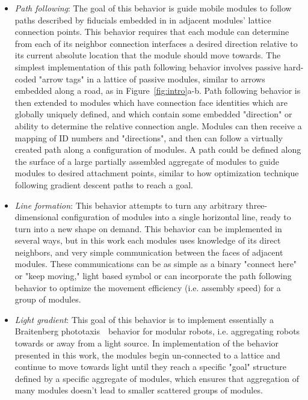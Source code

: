 \begin{itemize}
	\item \textit{Path following}: The goal of this behavior is guide mobile modules to follow paths described by fiducials embedded in in adjacent modules' lattice connection points. This behavior requires that  each module can determine from each of its neighbor connection interfaces a desired direction relative to its current absolute location that the module should move towards. The simplest implementation of this path following behavior involves passive hard-coded "arrow tags" in a lattice of passive modules, similar to arrows embedded along a road, as in Figure~\ref{fig:intro}a-b. Path following behavior is then extended to modules which have connection face identities which are globally uniquely defined, and which contain some embedded "direction" or ability to determine the relative connection angle. Modules can then receive a mapping of ID numbers and "directions", and then can follow a virtually created path along a configuration of modules. A path could be defined along the surface of a large partially assembled aggregate of modules to guide modules to desired attachment points, similar to how optimization technique following gradient descent paths to reach a goal.
	
	\item \textit{Line formation}: This behavior attempts to turn any arbitrary three-dimensional configuration of modules into a single horizontal line, ready to turn into a new shape on demand. This behavior can be implemented in several ways, but in this work each modules uses knowledge of its direct neighbors, and very simple communication between the faces of adjacent modules. These communications can be as simple as a binary "connect here" or "keep moving," light based symbol or can incorporate the path following behavior to optimize the movement efficiency (i.e. assembly speed) for a group of modules.
	
	\item \textit{Light gradient}: This goal of this behavior is to implement essentially a Braitenberg phototaxis~\ behavior for modular robots, i.e. aggregating robots towards or away from a light source. In implementation of the behavior presented in this work, the modules begin un-connected to a lattice and continue to move towards light until they reach a specific "goal" structure defined by a specific aggregate of modules, which ensures that aggregation of many modules doesn't lead to smaller scattered groups of modules.
\end{itemize}

